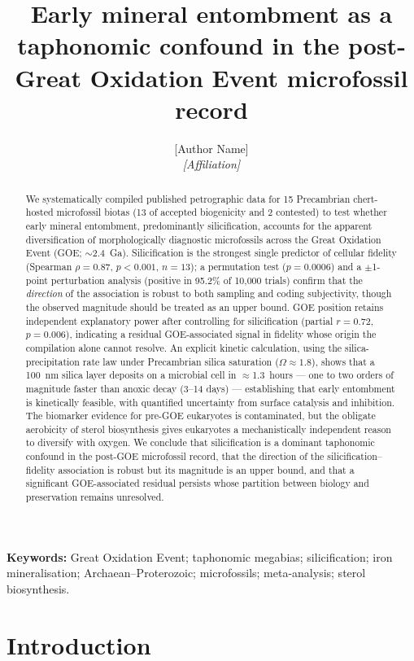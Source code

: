 \documentclass[11pt]{article}
\title{\vspace{-1.0cm}\textbf{Early mineral entombment as a taphonomic confound in the
post-Great Oxidation Event microfossil record}}
\author{[Author Name]\\
\small\textit{[Affiliation]}}
\date{}
\begin{document}
\maketitle

\begin{abstract}
\noindent We systematically compiled published petrographic data for 15 Precambrian chert-hosted
microfossil biotas (13 of accepted biogenicity and 2 contested) to test whether early mineral
entombment, predominantly silicification, accounts for the apparent diversification of
morphologically diagnostic microfossils across the Great Oxidation Event (GOE; $\sim$2.4~Ga).
Silicification is the strongest single predictor of cellular fidelity (Spearman $\rho = 0.87$,
$p < 0.001$, $n = 13$); a permutation test ($p = 0.0006$) and a $\pm$1-point perturbation analysis
(positive in 95.2\% of 10{,}000 trials) confirm that the \emph{direction} of the association is
robust to both sampling and coding subjectivity, though the observed magnitude should be treated as
an upper bound. GOE position retains independent explanatory power after controlling for
silicification (partial $r = 0.72$, $p = 0.006$), indicating a residual GOE-associated signal in
fidelity whose origin the compilation alone cannot resolve. An explicit kinetic calculation, using
the \citet{Rimstidt1980} silica-precipitation rate law under Precambrian silica saturation
($\Omega \approx 1.8$), shows that a 100~nm silica layer deposits on a microbial cell in
$\approx$1.3~hours --- one to two orders of magnitude faster than anoxic decay (3--14 days) ---
establishing that early entombment is kinetically feasible, with quantified uncertainty from surface
catalysis and inhibition. The biomarker evidence for pre-GOE eukaryotes is contaminated, but the
obligate aerobicity of sterol biosynthesis gives eukaryotes a mechanistically independent reason to
diversify with oxygen. We conclude that silicification is a dominant taphonomic confound in the
post-GOE microfossil record, that the direction of the silicification--fidelity association is
robust but its magnitude is an upper bound, and that a significant GOE-associated residual persists
whose partition between biology and preservation remains unresolved.
\end{abstract}

\noindent\textbf{Keywords:} Great Oxidation Event; taphonomic megabias; silicification; iron
mineralisation; Archaean--Proterozoic; microfossils; meta-analysis; sterol biosynthesis.

\section{Introduction}
\end{document}
